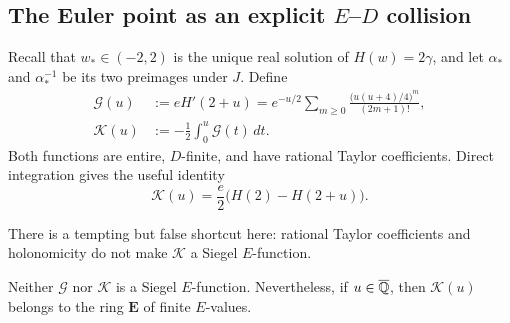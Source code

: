 \subsection{The Euler point as an explicit
\texorpdfstring{$E$--$D$}{E--D} collision}

Recall that \(w_*\in(-2,2)\) is the unique real solution of
\(H(w)=2\gamma\), and let \(\alpha_*\) and \(\alpha_*^{-1}\) be its two
preimages under \(J\).  Define
\begin{align}
 \mathcal G(u)
 &:=eH'(2+u)
   =e^{-u/2}\sum_{m\geq0}
     \frac{\bigl(u(u+4)/4\bigr)^m}{(2m+1)!},
     \label{eq:ssc-G-definition}\\
 \mathcal K(u)
 &:=-\frac12\int_0^u\mathcal G(t)\,dt.
     \label{eq:ssc-K-definition}
\end{align}
Both functions are entire, $D$-finite, and have rational Taylor
coefficients.  Direct integration gives the useful identity
\begin{equation}\label{eq:ssc-K-H-identity}
 \mathcal K(u)=\frac e2\bigl(H(2)-H(2+u)\bigr).
\end{equation}

There is a tempting but false shortcut here: rational Taylor coefficients
and holonomicity do not make \(\mathcal K\) a Siegel \(E\)-function.

\begin{proposition}
\label{prop:ssc-K-not-E}
Neither \(\mathcal G\) nor \(\mathcal K\) is a Siegel \(E\)-function.
Nevertheless, if \(u\in\overline{\mathbb Q}\), then \(\mathcal K(u)\) belongs to the ring
\(\mathbf E\) of finite \(E\)-values.
\end{proposition}

